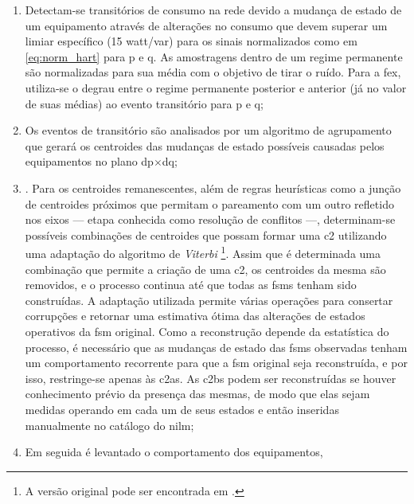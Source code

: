 \begin{enumerate}[label=\textbf{1.\arabic*},wide=\parindent]
\begin{enumerate}[label=\arabic*]
\item Detectam-se transitórios de consumo na rede devido a mudança de
estado de um equipamento através de alterações no consumo que devem
superar um limiar específico (15 \acs{watt}/\acs{var}) para os sinais
normalizados como em \ref{eq:norm_hart} para \acs{p} e \acs{q}.
As amostragens dentro de um regime permanente são normalizadas para
sua média com o objetivo de tirar o ruído. Para a \gls{fex}, utiliza-se o
degrau entre o regime permanente posterior e anterior (já no valor de
suas médias) ao evento transitório para \gls{p} e \gls{q};
\item Os eventos de transitório são analisados por um algoritmo de
agrupamento que gerará os centroides das mudanças de estado
possíveis causadas pelos equipamentos no plano
\acs{dp}$\times$\acs{dq};
\item {}. Para os
centroides remanescentes, além de regras heurísticas como a junção de
centroides próximos que permitam o pareamento com um outro refletido
nos eixos --- etapa conhecida como resolução de conflitos ---,
determinam-se possíveis combinações de centroides que possam formar
uma \gls{c2} utilizando uma adaptação do algoritmo de \emph{Viterbi}
\cite{nilm_bouloutas_viterbi_ext_1991_11,
nilm_hart_fsm_viterbi_1993_12}\footnote{A versão original pode ser
encontrada em \cite{viterbi_alg}.}. Assim que é determinada uma combinação
que permite a criação de uma \gls{c2}, os centroides da mesma são
removidos, e o processo continua até que todas as \glspl{fsm} tenham
sido construídas. A adaptação utilizada
\cite{nilm_bouloutas_viterbi_ext_1991_11,
nilm_hart_fsm_viterbi_1993_12} permite várias operações para consertar
corrupções e retornar uma estimativa ótima das alterações de estados
operativos da \gls{fsm} original. Como a reconstrução depende da
estatística do processo, é necessário que as mudanças de estado das
\glspl{fsm} observadas tenham um comportamento recorrente para que a \gls{fsm}
original seja reconstruída, e por isso, restringe-se apenas às
\glspl{c2a}. As \glspl{c2b} podem ser reconstruídas se houver
conhecimento prévio da presença das mesmas, de modo que elas sejam
medidas operando em cada um de seus estados e então inseridas
manualmente no catálogo do \gls{nilm};
\item Em seguida é levantado o comportamento dos equipamentos,

\end{enumerate}
\end{enumerate}
